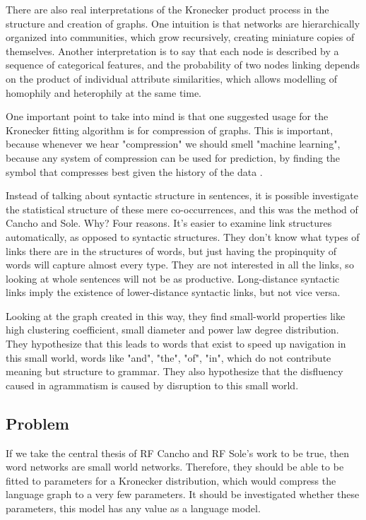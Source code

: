 \documentclass[12pt]{article}
\begin{document}
There are also real interpretations of the Kronecker product process in the structure and creation of graphs. One intuition is that networks are hierarchically organized into communities, which grow recursively, creating miniature copies of themselves. Another interpretation is to say that each node is described by a sequence of categorical features, and the probability of two nodes linking depends on the product of individual attribute similarities, which allows modelling of homophily and heterophily at the same time.

One important point to take into mind is that one suggested usage for the Kronecker fitting algorithm is for compression of graphs. This is important, because whenever we hear "compression" we should smell "machine learning", because any system of compression can be used for prediction, by finding the symbol that compresses best given the history of the data \cite{mlcompression}.

Instead of talking about syntactic structure in sentences, it is possible investigate the statistical structure of these mere co-occurrences, and this was the method of Cancho and Sole. Why? Four reasons. It's easier to examine link structures automatically, as opposed to syntactic structures. They don't know what types of links there are in the structures of words, but just having the propinquity of words will capture almost every type. They are not interested in all the links, so looking at whole sentences will not be as productive. Long-distance syntactic links imply the existence of lower-distance syntactic links, but not vice versa.

Looking at the graph created in this way, they find small-world properties like high clustering coefficient, small diameter and power law degree distribution. They hypothesize that this leads to words that exist to speed up navigation in this small world, words like "and", "the", "of", "in", which do not contribute meaning but structure to grammar. They also hypothesize that the disfluency caused in agrammatism is caused by disruption to this small world.

\subsection{Problem}

If we take the central thesis of RF Cancho and RF Sole's work to be true, then word networks are small world networks. Therefore, they should be able to be fitted to parameters for a Kronecker distribution, which would compress the language graph to a very few parameters. It should be investigated whether these parameters, this model has any value as a language model.
\end{document}
